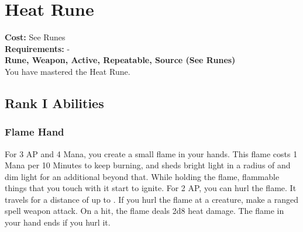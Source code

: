 \section{Heat Rune}\label{rune:heat}
\textbf{Cost:} See Runes\\
\textbf{Requirements:} -\\
\textbf{Rune, Weapon, Active, Repeatable, Source (See Runes)}\\
You have mastered the Heat Rune.

\subsection{Rank I Abilities}

\subsubsection{Flame Hand}
For 3 AP and 4 Mana, you create a small flame in your hands.
This flame costs 1 Mana per 10 Minutes to keep burning, and sheds bright light in a radius of  and dim light for an additional  beyond that.
While holding the flame, flammable things that you touch with it start to ignite.
For 2 AP, you can hurl the flame.
It travels for a distance of up to .
If you hurl the flame at a creature, make a ranged spell weapon attack.
On a hit, the flame deals 2d8 heat damage.
The flame in your hand ends if you hurl it.